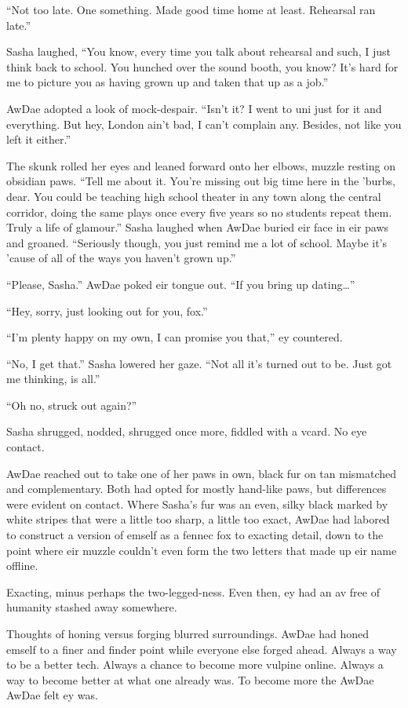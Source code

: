 ``Not too late. One something. Made good time home at least. Rehearsal ran late.''

Sasha laughed, ``You know, every time you talk about rehearsal and such, I just think back to school. You hunched over the sound booth, you know? It's hard for me to picture you as having grown up and taken that up as a job.''

AwDae adopted a look of mock-despair. ``Isn't it? I went to uni just for it and everything. But hey, London ain't bad, I can't complain any. Besides, not like you left it either.''

The skunk rolled her eyes and leaned forward onto her elbows, muzzle resting on obsidian paws. ``Tell me about it. You're missing out big time here in the 'burbs, dear. You could be teaching high school theater in any town along the central corridor, doing the same plays once every five years so no students repeat them. Truly a life of glamour.'' Sasha laughed when AwDae buried eir face in eir paws and groaned. ``Seriously though, you just remind me a lot of school. Maybe it's 'cause of all of the ways you haven't grown up.''

``Please, Sasha.'' AwDae poked eir tongue out. ``If you bring up dating\ldots{}''

``Hey, sorry, just looking out for you, fox.''

``I'm plenty happy on my own, I can promise you that,'' ey countered.

``No, I get that.'' Sasha lowered her gaze. ``Not all it's turned out to be. Just got me thinking, is all.''

``Oh no, struck out again?''

Sasha shrugged, nodded, shrugged once more, fiddled with a vcard. No eye contact.

AwDae reached out to take one of her paws in own, black fur on tan mismatched and complementary. Both had opted for mostly hand-like paws, but differences were evident on contact. Where Sasha's fur was an even, silky black marked by white stripes that were a little too sharp, a little too exact, AwDae had labored to construct a version of emself as a fennec fox to exacting detail, down to the point where eir muzzle couldn't even form the two letters that made up eir name offline.

Exacting, minus perhaps the two-legged-ness. Even then, ey had an av free of humanity stashed away somewhere.

Thoughts of honing versus forging blurred surroundings. AwDae had honed emself to a finer and finder point while everyone else forged ahead. Always a way to be a better tech. Always a chance to become more vulpine online. Always a way to become better at what one already was. To become more the AwDae AwDae felt ey was.

